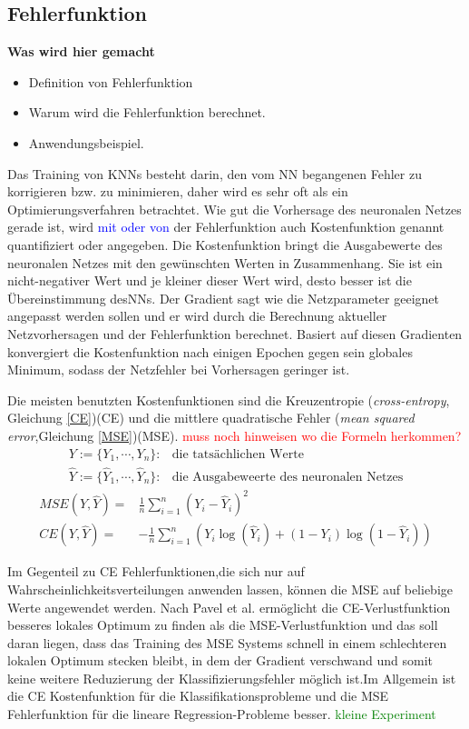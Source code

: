 \documentclass[12pt,a4paper]{scrartcl}
\numberwithin{equation}{section}
\begin{document}
\subsection{Fehlerfunktion}
\textbf{Was wird hier gemacht}
\begin{itemize}
	\item Definition von Fehlerfunktion
	\item Warum wird die Fehlerfunktion berechnet.
	\item  Anwendungsbeispiel.
\end{itemize}
Das Training von \acsp{KNN} besteht darin, den vom \ac{NN} begangenen Fehler zu korrigieren bzw. zu minimieren, daher wird es sehr oft als ein Optimierungsverfahren betrachtet.
Wie gut die Vorhersage des neuronalen Netzes gerade ist, wird \textcolor{blue}{mit oder von} der Fehlerfunktion auch Kostenfunktion genannt quantifiziert oder angegeben.
Die Kostenfunktion bringt die Ausgabewerte des neuronalen Netzes mit den gewünschten Werten in Zusammenhang. Sie ist ein nicht-negativer Wert und je kleiner dieser Wert wird, desto besser ist die Übereinstimmung des\acsp{NN}.
Der Gradient sagt wie die Netzparameter geeignet angepasst werden sollen und er wird durch die Berechnung aktueller Netzvorhersagen und der Fehlerfunktion berechnet. Basiert auf diesen Gradienten konvergiert die Kostenfunktion nach einigen Epochen gegen sein globales Minimum, sodass der Netzfehler bei Vorhersagen geringer ist.

Die meisten benutzten Kostenfunktionen sind die Kreuzentropie (\textit{cross-entropy}, Gleichung \ref{CE})(CE) und die mittlere quadratische Fehler (\textit{mean squared error},Gleichung \ref{MSE})(MSE). \textcolor{red}{muss noch hinweisen wo die Formeln herkommen?}
\begin{align*}
	Y:=\{Y_1,\cdots, Y_n\} :&\text{die tatsächlichen Werte} \\
	\widehat{Y}:=\{\widehat{Y}_1,\cdots, \widehat{Y}_n\} :&\text{die Ausgabeweerte des neuronalen Netzes}
\end{align*}
\begin{align}
	\label{MSE}	
	MSE(Y, \widehat{Y}) =&\frac{1}{n}\sum_{i = 1}^{n}(Y_i - \widehat{Y}_i)^2\\
	\label{CE}
	CE(Y, \widehat{Y}) =&-\frac{1}{n}\sum_{i = 1}^{n}(Y_i\log(\widehat{Y}_i) +(1-Y_i)\log(1- \widehat{Y}_i))
\end{align}

Im Gegenteil zu CE Fehlerfunktionen,die sich nur auf Wahrscheinlichkeitsverteilungen anwenden lassen, können die MSE auf beliebige Werte angewendet werden. Nach Pavel et al.\cite{7} ermöglicht die CE-Verlustfunktion besseres lokales Optimum zu finden als die MSE-Verlustfunktion und das soll daran liegen, dass das Training des MSE Systems schnell in einem schlechteren lokalen Optimum stecken bleibt, in dem der Gradient verschwand und somit keine weitere Reduzierung der Klassifizierungsfehler möglich ist.Im Allgemein ist die CE Kostenfunktion für die Klassifikationsprobleme und die MSE Fehlerfunktion für die lineare Regression-Probleme besser.
\textcolor{green}{kleine Experiment}
\end{document}
